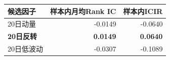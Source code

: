 \begin{tabular}{@{}lrr@{}}
\toprule
候选因子 & 样本内月均Rank IC & 样本内ICIR \\
\midrule
20日动量 & -0.0149 & -0.0640 \\
\textbf{20日反转} & \textbf{0.0149} & \textbf{0.0640} \\
20日低波动 & -0.0307 & -0.1089 \\
\bottomrule
\end{tabular}
